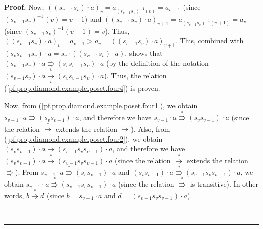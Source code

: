 \documentclass[numbers=enddot,12pt,final,onecolumn,notitlepage]{scrartcl}%
\theoremstyle{definition}
\newenvironment{proof}[1][Proof]{\noindent\textbf{#1.} }{\ \rule{0.5em}{0.5em}}
\newenvironment{verlong}{}{}
\begin{document}
\begin{proof}
\begin{verlong}
Now, $\left(  \left(  s_{v-1}s_{v}\right)  \cdot a\right)  _{v}=a_{\left(
s_{v-1}s_{v}\right)  ^{-1}\left(  v\right)  }=a_{v-1}$ (since $\left(
s_{v-1}s_{v}\right)  ^{-1}\left(  v\right)  =v-1$) and $\left(  \left(
s_{v-1}s_{v}\right)  \cdot a\right)  _{v+1}=a_{\left(  s_{v-1}s_{v}\right)
^{-1}\left(  v+1\right)  }=a_{v}$ (since $\left(  s_{v-1}s_{v}\right)
^{-1}\left(  v+1\right)  =v$). Thus, $\left(  \left(  s_{v-1}s_{v}\right)
\cdot a\right)  _{v}=a_{v-1}>a_{v}=\left(  \left(  s_{v-1}s_{v}\right)  \cdot
a\right)  _{v+1}$. This, combined with $\left(  s_{v}s_{v-1}s_{v}\right)
\cdot a=s_{v}\cdot\left(  \left(  s_{v-1}s_{v}\right)  \cdot a\right)  $,
shows that $\left(  s_{v-1}s_{v}\right)  \cdot a\underset{v}{\Rrightarrow
}\left(  s_{v}s_{v-1}s_{v}\right)  \cdot a$ (by the definition of the notation
$\left(  s_{v-1}s_{v}\right)  \cdot a\underset{v}{\Rrightarrow}\left(
s_{v}s_{v-1}s_{v}\right)  \cdot a$). Thus, the relation
(\ref{pf.prop.diamond.example.poset.four4}) is proven.

Now, from (\ref{pf.prop.diamond.example.poset.four1}), we obtain $s_{v-1}\cdot
a\Rrightarrow\left(  s_{v}s_{v-1}\right)  \cdot a$, and therefore we have
$s_{v-1}\cdot a\overset{\ast}{\Rrightarrow}\left(  s_{v}s_{v-1}\right)  \cdot
a$ (since the relation $\overset{\ast}{\Rrightarrow}$ extends the relation
$\Rrightarrow$). Also, from (\ref{pf.prop.diamond.example.poset.four2}), we
obtain $\left(  s_{v}s_{v-1}\right)  \cdot a\Rrightarrow\left(  s_{v-1}%
s_{v}s_{v-1}\right)  \cdot a$, and therefore we have $\left(  s_{v}%
s_{v-1}\right)  \cdot a\overset{\ast}{\Rrightarrow}\left(  s_{v-1}s_{v}%
s_{v-1}\right)  \cdot a$ (since the relation $\overset{\ast}{\Rrightarrow}$
extends the relation $\Rrightarrow$). From $s_{v-1}\cdot a\overset{\ast
}{\Rrightarrow}\left(  s_{v}s_{v-1}\right)  \cdot a$ and $\left(  s_{v}%
s_{v-1}\right)  \cdot a\overset{\ast}{\Rrightarrow}\left(  s_{v-1}s_{v}%
s_{v-1}\right)  \cdot a$, we obtain $s_{v-1}\cdot a\overset{\ast
}{\Rrightarrow}\left(  s_{v-1}s_{v}s_{v-1}\right)  \cdot a$ (since the
relation $\overset{\ast}{\Rrightarrow}$ is transitive). In other words,
$b\overset{\ast}{\Rrightarrow}d$ (since $b=s_{v-1}\cdot a$ and $d=\left(
s_{v-1}s_{v}s_{v-1}\right)  \cdot a$).


\end{verlong}
\end{proof}
\end{document}
